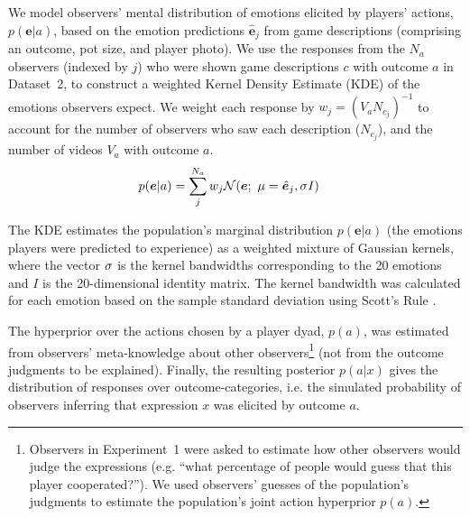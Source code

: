 \documentclass[10pt,letterpaper]{article}
\begin{document}
We model observers' mental distribution of emotions elicited by players' actions, $p(\bm{e}|a)$, based on the emotion predictions $\hat{\bm{e}}_j$ from game descriptions (comprising an outcome, pot size, and player photo). We use the responses from the $N_a$ observers (indexed by $j$) who were shown game descriptions $c$ with outcome $a$ in Dataset~2, to construct a weighted Kernel Density Estimate (KDE) of the emotions observers expect.
We weight each response by $w_j = (V_{a}N_{c_j})^{-1}$ to account for the number of observers who saw each description ($N_{c_j}$), and the number of videos $V_a$ with outcome $a$.
%
\begin{align} \label{eq:borkernel}
    p(\bm{e}|a) &= \sum^{N_a}_{j} w_j \mathcal{N}(\bm{e} ; \  \mu=\hat{\bm{e}}_j, \bf{\sigma}\mathit{I})
\end{align}

The KDE estimates the population's marginal distribution \( p(\bm{e}|a) \) (the emotions players were predicted to experience) as a weighted mixture of Gaussian kernels, where the vector \( \bf{\sigma} \) is the kernel bandwidths corresponding to the 20 emotions and \( \mathit{I} \) is the 20-dimensional identity matrix.
The kernel bandwidth was calculated for each emotion based on the sample standard deviation using Scott's Rule \citep{scott1992}.


The hyperprior over the actions chosen by a player dyad, $p(a)$, was estimated from observers' meta-knowledge about other observers\footnote{
Observers in Experiment~1 were asked to estimate how other observers would judge the expressions (e.g. ``what percentage of people would guess that this player cooperated?''). 
We used observers' guesses of the population's judgments to estimate the population's joint action hyperprior $p(a)$.
} (not from the outcome judgments to be explained).
Finally, the resulting posterior $p(a|x)$ gives the distribution of responses over outcome-categories, i.e.
the simulated probability of observers inferring that expression $x$ was elicited by outcome $a$.
\end{document}
